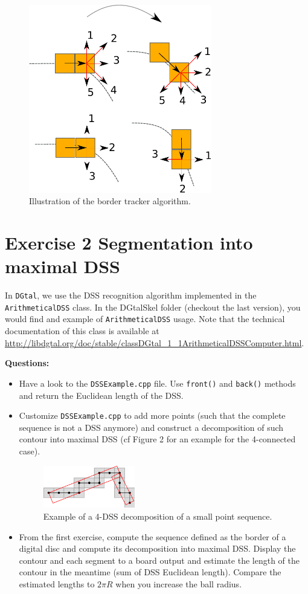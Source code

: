 \documentclass[a4paper, 11pt]{article}
\begin{document}
\begin{figure}[h]
\centering
\includegraphics[width=8cm]{orientations}
\caption{Illustration of the border tracker algorithm.}
\end{figure}


\section*{Exercise 2 \rm Segmentation into maximal DSS}

\par In \texttt{DGtal}, we use the DSS recognition algorithm implemented in the \texttt{ArithmeticalDSS} class. In the DGtalSkel folder (checkout the last version), you would find and example of \texttt{ArithmeticalDSS} usage. Note that the technical documentation of this class is available at \url{http://libdgtal.org/doc/stable/classDGtal_1_1ArithmeticalDSSComputer.html}.

{\bf Questions:}
\begin{itemize}
	\item Have a look to the \texttt{DSSExample.cpp} file. Use \texttt{front()} and \texttt{back()} methods and return the Euclidean length of the DSS.
	\item  Customize \texttt{DSSExample.cpp} to add more points (such that the complete sequence is not a DSS anymore) and construct a decomposition of such contour into maximal DSS (cf Figure 2 for an example for the 4-connected case).
	\begin{figure}[h]
	\centering
	\includegraphics[width=4cm]{exampleDSS-3.png}
	\caption{Example of a 4-DSS decomposition of a small point sequence.}
	\end{figure}

	\item From the first exercise, compute the sequence defined as the border of a digital disc and compute its decomposition into maximal DSS. Display the contour and each segment to a board output and estimate the length of the contour in the meantime (sum of DSS Euclidean length).  Compare the estimated lengths to $2\pi R$ when you increase the ball radius.
\end{itemize}
\end{document}
